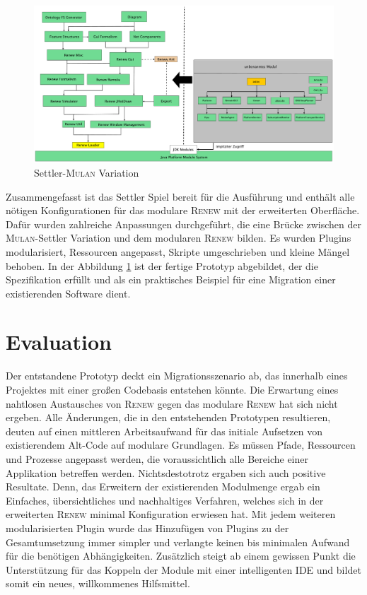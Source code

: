 	\begin{figure}[h!]
	  \centering
	  \includegraphics[width=\textwidth]{material/images/settler-renew-mulan-vm.pdf}
	  \caption{Settler-\textsc{Mulan} Variation}
	  \label{fig:mul_prot}
	\end{figure}

	Zusammengefasst ist das Settler Spiel bereit für die Ausführung und enthält alle nötigen Konfigurationen für das modulare \textsc{Renew} mit der erweiterten Oberfläche. Dafür wurden zahlreiche Anpassungen durchgeführt, die eine Brücke zwischen der \textsc{Mulan}-Settler Variation und dem modularen \textsc{Renew} bilden. Es wurden Plugins modularisiert, Ressourcen angepasst, Skripte umgeschrieben und kleine Mängel behoben. \newline
	In der Abbildung \ref{fig:mul_prot} ist der fertige Prototyp abgebildet, der die Spezifikation erfüllt und als ein praktisches Beispiel für eine Migration einer existierenden Software dient. 

\section{Evaluation}
	Der entstandene Prototyp deckt ein Migrationsszenario ab, das innerhalb eines Projektes mit einer großen Codebasis entstehen könnte. Die Erwartung eines nahtlosen Austausches von \textsc{Renew} gegen das modulare \textsc{Renew} hat sich nicht ergeben. Alle Änderungen, die in den entstehenden Prototypen resultieren, deuten auf einen mittleren Arbeitsaufwand für das initiale Aufsetzen von existierendem Alt-Code auf modulare Grundlagen. Es müssen Pfade, Ressourcen und Prozesse angepasst werden, die voraussichtlich alle Bereiche einer Applikation betreffen werden.\newline
	Nichtsdestotrotz ergaben sich auch positive Resultate. Denn, das Erweitern der existierenden Modulmenge ergab ein Einfaches, übersichtliches und nachhaltiges Verfahren, welches sich in der erweiterten \textsc{Renew} minimal Konfiguration erwiesen hat. Mit jedem weiteren modularisierten Plugin wurde das Hinzufügen von Plugins zu der Gesamtumsetzung immer simpler und verlangte keinen bis minimalen Aufwand für die benötigen Abhängigkeiten. Zusätzlich steigt ab einem gewissen Punkt die Unterstützung für das Koppeln der Module mit einer intelligenten IDE und bildet somit ein neues, willkommenes Hilfsmittel.
